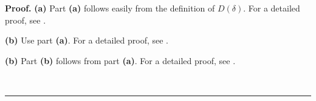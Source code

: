 \documentclass[numbers=enddot,12pt,final,onecolumn,notitlepage]{scrartcl}%
\theoremstyle{definition}
\newenvironment{proof}[1][Proof]{\noindent\textbf{#1.} }{\ \rule{0.5em}{0.5em}}
\newenvironment{verlong}{}{}
\newenvironment{vershort}{}{}
\begin{document}
\begin{proof}
\textbf{(a)} Part \textbf{(a)} follows easily from the definition of $D\left(
\delta\right)  $. For a detailed proof, see \cite[Corollary 2.6]{comps}.

\begin{vershort}
\textbf{(b)} Use part \textbf{(a)}. For a detailed proof, see \cite[Corollary
2.7]{comps}. \qedhere

\end{vershort}

\begin{verlong}
\textbf{(b)} Part \textbf{(b)} follows from part \textbf{(a)}. For a detailed
proof, see \cite[Corollary 2.7]{comps}. \qedhere

\end{verlong}
\end{proof}
\end{document}
